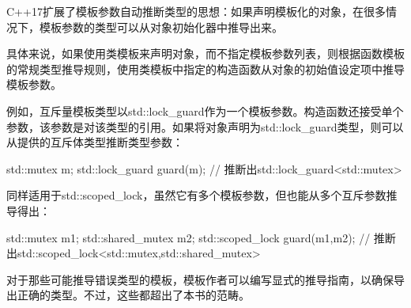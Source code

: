 
C++17扩展了模板参数自动推断类型的思想：如果声明模板化的对象，在很多情况下，模板参数的类型可以从对象初始化器中推导出来。

具体来说，如果使用类模板来声明对象，而不指定模板参数列表，则根据函数模板的常规类型推导规则，使用类模板中指定的构造函数从对象的初始值设定项中推导模板参数。

例如，互斥量模板类型以std::lock\_guard作为一个模板参数。构造函数还接受单个参数，该参数是对该类型的引用。如果将对象声明为std::lock\_guard类型，则可以从提供的互斥体类型推断类型参数：

\begin{cpp}
std::mutex m;
std::lock_guard guard(m); // 推断出std::lock_guard<std::mutex>
\end{cpp}

同样适用于std::scoped\_lock，虽然它有多个模板参数，但也能从多个互斥参数推导得出：

\begin{cpp}
std::mutex m1;
std::shared_mutex m2;
std::scoped_lock guard(m1,m2);
// 推断出std::scoped_lock<std::mutex,std::shared_mutex>
\end{cpp}

对于那些可能推导错误类型的模板，模板作者可以编写显式的推导指南，以确保导出正确的类型。不过，这些都超出了本书的范畴。